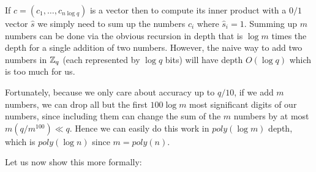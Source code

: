 
If \(c=(c_1,\ldots,c_{n\log q})\) is a vector then to compute its inner
product with a \(0/1\) vector \(\hat{s}\) we simply need to sum up the
numbers \(c_i\) where \(\hat{s}_i=1\). Summing up \(m\) numbers can be
done via the obvious recursion in depth that is \(\log m\) times the
depth for a single addition of two numbers. However, the naive way to
add two numbers in \({\mathbb{Z}}_q\) (each represented by \(\log q\) bits) will
have depth \(O(\log q)\) which is too much for us.


Fortunately, because we only care about accuracy up to \(q/10\), if we
add \(m\) numbers, we can drop all but the first \(100\log m\) most
significant digits of our numbers, since including them can change the
sum of the \(m\) numbers by at most \(m(q/m^{100}) \ll q\). Hence we can
easily do this work in \(poly(\log m)\) depth, which is \(poly(\log n)\)
since \(m=poly(n)\).

Let us now show this more formally:

\hypertarget{decdepthlem}{}

